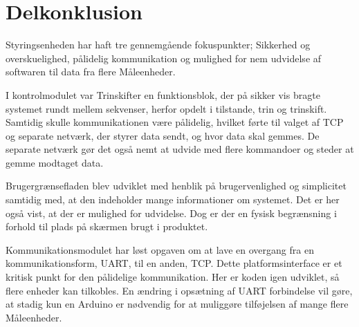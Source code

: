 
\section{Delkonklusion}

Styringsenheden har haft tre gennemgående fokuspunkter; Sikkerhed og overskuelighed, pålidelig kommunikation og mulighed for nem udvidelse af softwaren til data fra flere Måleenheder.


I kontrolmodulet var Trinskifter en funktionsblok, der på sikker vis bragte systemet rundt mellem sekvenser, herfor opdelt i tilstande, trin og trinskift. Samtidig skulle kommunikationen være pålidelig, hvilket førte til valget af TCP og separate netværk, der styrer data sendt, og hvor data skal gemmes. De separate netværk gør det også nemt at udvide med flere kommandoer og steder at gemme modtaget data.


Brugergrænsefladen blev udviklet med henblik på brugervenlighed og simplicitet samtidig med, at den indeholder mange informationer om systemet. Det er her også vist, at der er mulighed for udvidelse. Dog er der en fysisk begrænsning i forhold til plads på skærmen brugt i produktet.


Kommunikationsmodulet har løst opgaven om at lave en overgang fra en kommunikationsform, UART, til en anden, TCP. Dette platformsinterface er et kritisk punkt for den pålidelige kommunikation. Her er koden igen udviklet, så flere enheder kan tilkobles. En ændring i opsætning af UART forbindelse vil gøre, at stadig kun en Arduino er nødvendig for at muliggøre tilføjelsen af mange flere Måleenheder.
